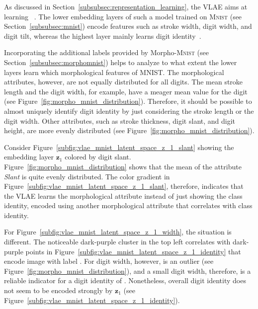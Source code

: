 As discussed in Section~\ref{subsubsec:representation_learning}, the \acl{VLAE} aims at learning ~\citep{zhao2017learning}.
The lower embedding layers of such a model trained on \textsc{Mnist} (see Section~\ref{subsubsec:mnist}) encode features such as stroke width, digit width, and digit tilt, whereas the highest layer mainly learns digit identity~\citep{zhao2017learning}.

Incorporating the additional labels provided by Morpho-\textsc{Mnist} (see Section~\ref{subsubsec:morphomnist}) helps to analyze to what extent the lower layers learn which morphological features of \textsc{MNIST}.
The morphological attributes, however, are not equally distributed for all digits.
The mean stroke length and the digit width, for example, have a meager mean value for the digit  (see Figure~\ref{fig:morpho_mnist_distribution}).
Therefore, it should be possible to almost uniquely identify digit  identity by just considering the stroke length or the digit width.
Other attributes, such as stroke thickness, digit slant, and digit height, are more evenly distributed (see Figure~\ref{fig:morpho_mnist_distribution}).

Consider Figure~\ref{subfig:vlae_mnist_latent_space_z_1_slant} showing the embedding layer $\bm{z}_1$ colored by digit slant.
Figure~\ref{fig:morpho_mnist_distribution} shows that the mean of the attribute \textit{Slant} is quite evenly distributed.
The color gradient in Figure~\ref{subfig:vlae_mnist_latent_space_z_1_slant}, therefore, indicates that the VLAE learns the morphological attribute instead of just showing the class identity, encoded using another morphological attribute that correlates with class identity.

For Figure~\ref{subfig:vlae_mnist_latent_space_z_1_width}, the situation is different.
The noticeable dark-purple cluster in the top left correlates with dark-purple points in Figure~\ref{subfig:vlae_mnist_latent_space_z_1_identity} that encode image with label .
For digit width, however,  is an outlier (see Figure~\ref{fig:morpho_mnist_distribution}), and a small digit width, therefore, is a reliable indicator for a digit identity of .
Nonetheless, overall digit identity does not seem to be encoded strongly by $\bm{z}_1$ (see Figure~\ref{subfig:vlae_mnist_latent_space_z_1_identity}).

